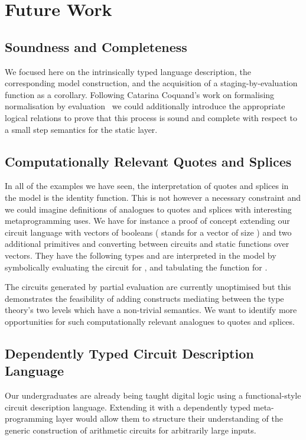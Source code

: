 \section{Future Work}

\subsection{Soundness and Completeness}
We focused here on the intrinsically typed language description,
the corresponding model construction, and the acquisition of a
staging-by-evaluation function as a corollary.
%
Following Catarina Coquand's work on formalising normalisation
by evaluation~\cite{DBLP:journals/lisp/Coquand02} we could
additionally introduce the appropriate logical relations to
prove that this process is sound and complete with respect
to a small step semantics for the static layer.

\subsection{Computationally Relevant Quotes and Splices}\label{sec:computrel}
In all of the examples we have seen, the interpretation of
quotes and splices in the model is the identity function.
This is not however a necessary constraint and we could
imagine definitions of analogues to quotes and splices
with interesting metaprogramming uses.
%
We have for instance a proof of concept extending our circuit
language with vectors of booleans (\AIC{`[}  \AIC{]} stands
for a vector of size ) and two additional primitives
 and  converting between circuits and static
functions over vectors.
%
They have the following types and are interpreted in the model
by symbolically evaluating the circuit for , and
tabulating the function for .


The circuits generated by partial evaluation are currently
unoptimised but this demonstrates the feasibility of adding
constructs mediating between the type theory's two levels
which have a non-trivial semantics.
%
We want to identify more opportunities for such computationally
relevant analogues to quotes and splices.

\subsection{Dependently Typed Circuit Description Language}
Our undergraduates are already being taught digital logic
using a functional-style circuit description language.
Extending it with a dependently typed meta-programming
layer would allow them to structure their understanding
of the generic construction of arithmetic circuits for
arbitrarily large inputs.

